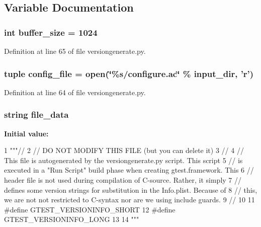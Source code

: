 \subsection{\-Variable \-Documentation}
\hypertarget{namespaceversiongenerate_af22ff4ab7a026e6c3b4b08eafb2df027}{
\subsubsection[{buffer\-\_\-size}]{\setlength{\rightskip}{0pt plus 5cm}int {\bf buffer\-\_\-size} = 1024}}\label{d3/d03/namespaceversiongenerate_af22ff4ab7a026e6c3b4b08eafb2df027}


\-Definition at line 65 of file versiongenerate.\-py.

\hypertarget{namespaceversiongenerate_ae6512f1802b7f1f9cc6f196a0938db60}{
\subsubsection[{config\-\_\-file}]{\setlength{\rightskip}{0pt plus 5cm}tuple {\bf config\-\_\-file} = open(\char`\"{}\%s/configure.\-ac\char`\"{} \% input\-\_\-dir, 'r')}}\label{d3/d03/namespaceversiongenerate_ae6512f1802b7f1f9cc6f196a0938db60}


\-Definition at line 64 of file versiongenerate.\-py.

\hypertarget{namespaceversiongenerate_a0cb0dcaab1cc3237a0c88b100cab3b32}{
\subsubsection[{file\-\_\-data}]{\setlength{\rightskip}{0pt plus 5cm}string {\bf file\-\_\-data}}}\label{d3/d03/namespaceversiongenerate_a0cb0dcaab1cc3237a0c88b100cab3b32}
{\bfseries \-Initial value\-:}
\begin{DoxyCode}
1 """//
2 // DO NOT MODIFY THIS FILE (but you can delete it)
3 //
4 // This file is autogenerated by the versiongenerate.py script. This script
5 // is executed in a "Run Script" build phase when creating gtest.framework.
       This
6 // header file is not used during compilation of C-source. Rather, it simply
7 // defines some version strings for substitution in the Info.plist. Because of
8 // this, we are not not restricted to C-syntax nor are we using include guards.
9 //
10 
11 #define GTEST_VERSIONINFO_SHORT %
12 #define GTEST_VERSIONINFO_LONG %
13 
14 """
\end{DoxyCode}


